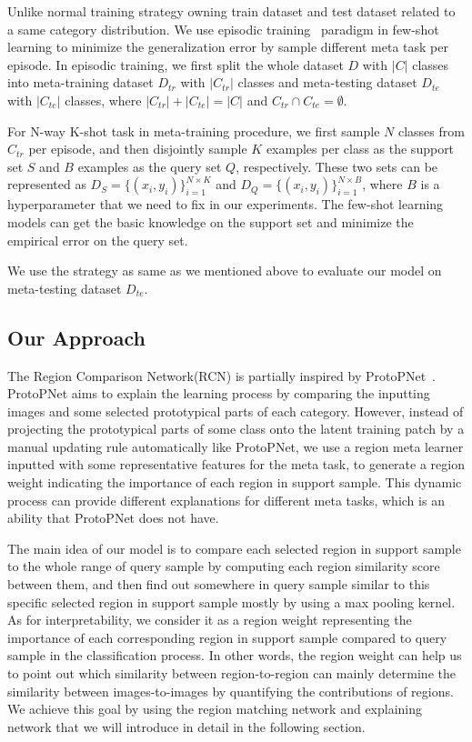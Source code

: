 \documentclass[letterpaper]{article}
\begin{document}
Unlike normal training strategy owning train dataset and test dataset related to a same category distribution. We use episodic training~\cite{VinyalsMatching} paradigm in few-shot learning to minimize the generalization error by sample different meta task per episode. In episodic training, we first split the whole dataset $D$ with $|C|$ classes into meta-training dataset $D_{tr}$ with $|C_{tr}|$ classes and meta-testing dataset $D_{te}$ with $|C_{te}|$ classes, where $|C_{tr}| + |C_{te}| = |C|$ and $C_{tr} \cap C_{te} = \emptyset$. 

For N-way K-shot task in meta-training procedure, we first sample $N$ classes from $C_{tr}$ per episode, and then disjointly sample $K$ examples per class as the support set $S$ and $B$ examples as the query set $Q$, respectively. These two sets can be represented as $D_{S}=\{(x_{i},y_{i})\}_{i=1}^{N\times K}$ and $D_{Q}=\{(x_{i},y_{i})\}_{i=1}^{N\times B}$, where $B$ is a hyperparameter that we need to fix in our experiments. The few-shot learning models can get the basic knowledge on the support set and minimize the empirical error on the query set. 

We use the strategy as same as we mentioned above to evaluate our model on meta-testing dataset $D_{te}$. 

\subsection{Our Approach}\label{subsection: model}
The Region Comparison Network(RCN) is partially inspired by ProtoPNet~\cite{Chen2018ThisLL}. ProtoPNet aims to explain the learning process by comparing the inputting images and some selected prototypical parts of each category. However, instead of projecting the prototypical parts of some class onto the latent training patch by a manual updating rule automatically like ProtoPNet, we use a region meta learner inputted with some representative features for the meta task, to generate a region weight indicating the importance of each region in support sample. This dynamic process can provide different explanations for different meta tasks, which is an ability that ProtoPNet does not have.

The main idea of our model is to compare each selected region in support sample to the whole range of query sample by computing each region similarity score between them, and then find out somewhere in query sample similar to this specific selected region in support sample mostly by using a max pooling kernel. As for interpretability, we consider it as a region weight representing the importance of each corresponding region in support sample compared to query sample in the classification process. In other words, the region weight can help us to point out which similarity between region-to-region can mainly determine the similarity between images-to-images by quantifying the contributions of regions. We achieve this goal by using the region matching network and explaining network that we will introduce in detail in the following section.
\end{document}
